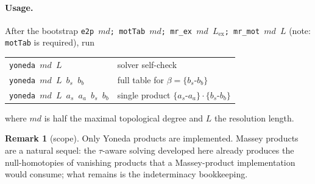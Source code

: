 \documentclass[11pt]{article}
\theoremstyle{definition}
\newtheorem{remark}{Remark}
\begin{document}
\paragraph{Usage.}
After the bootstrap \texttt{e2p $md$;\ motTab $md$;\ mr\_ex $md$ $L_{\mathrm{ex}}$;\
mr\_mot $md$ $L$} (note: \texttt{motTab} is required), run
\begin{center}
\begin{tabular}{ll}
\texttt{yoneda $md$ $L$} & solver self-check\\
\texttt{yoneda $md$ $L$ $b_s$ $b_b$} & full table for $\beta=\{b_s\text{-}b_b\}$\\
\texttt{yoneda $md$ $L$ $a_s$ $a_a$ $b_s$ $b_b$} & single product $\{a_s\text{-}a_a\}\cdot\{b_s\text{-}b_b\}$\\
\end{tabular}
\end{center}
where $md$ is half the maximal topological degree and $L$ the resolution length.

\begin{remark}[scope]
Only Yoneda products are implemented. Massey products are a natural sequel: the
$\tau$-aware solving developed here already produces the null-homotopies of
vanishing products that a Massey-product implementation would consume; what remains
is the indeterminacy bookkeeping.
\end{remark}
\end{document}
